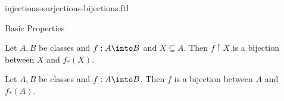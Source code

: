 \documentclass{naproche-library}
\begin{document}
\begin{smodule}[title={Injective, Surjective and Bijective Maps}]{injections-surjections-bijections.ftl}
\begin{sfragment}{Basic Properties}
  \begin{proposition}[forthel,id=FOUNDATIONS_08_647446231252992]
    Let $A, B$ be classes and $f : A \into B$ and $X \subseteq A$.
    Then $f \restriction X$ is a bijection between $X$ and $f_{*}(X)$.
  \end{proposition}

  \begin{corollary}[forthel,id=FOUNDATIONS_08_8159443759923200]
    Let $A, B$ be classes and $f : A \into B$.
    Then $f$ is a bijection between $A$ and $f_{*}(A)$.
  \end{corollary}
\end{sfragment}
\end{smodule}
\end{document}
